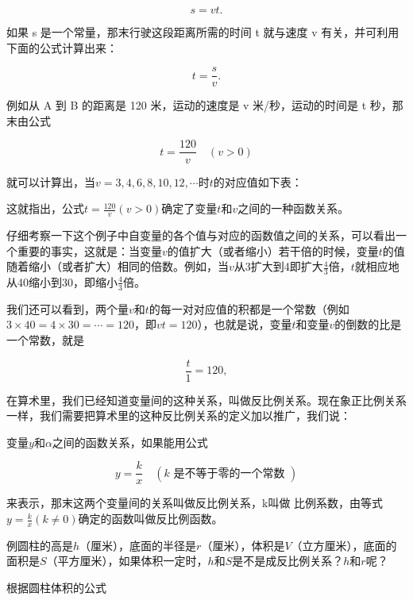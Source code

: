 \[
s = v t.
\]

如果 s 是一个常量，那末行驶这段距离所需的时间 t 就与速度 v
有关，并可利用下面的公式计算出来：

\[
t = \frac{s}{v}.
\]

例如从 A 到 B 的距离是 120 米，运动的速度是 v 米/秒，运动的时间是 t
秒，那末由公式

\[
t = \frac{120}{v} \quad (v > 0) \tag {1}
\]

就可以计算出，当\(v = 3, 4, 6, 8, 10, 12, \cdots\)时\(t\)的对应值如下表：

{\centering
\small\setlength{\tabcolsep}{3pt}%
\par
}

这就指出，公式\(t = \frac{120}{v} (v > 0)\)确定了变量\(t\)和\(v\)之间的一种函数关系。

仔细考察一下这个例子中自变量的各个值与对应的函数值之间的关系，可以看出一个重要的事实，这就是：当变量\(v\)的值扩大（或者缩小）若干倍的时候，变量\(t\)的值随着缩小（或者扩大）相同的倍数。例如，当\(v\)从3扩大到4即扩大\(\frac{4}{3}\)倍，\(t\)就相应地从40缩小到30，即缩小\(\frac{4}{3}\)倍。

我们还可以看到，两个量\(v\)和\(t\)的每一对对应值的积都是一个常数（例如\(3 \times 40 = 4 \times 30 = \cdots = 120\)，即\(vt = 120\)），也就是说，变量\(t\)和变量\(v\)的倒数的比是一个常数，就是

\[
\frac{t}{1} = 120,
\]

在算术里，我们已经知道变量间的这种关系，叫做反比例关系。现在象正比例关系一样，我们需要把算术里的这种反比例关系的定义加以推广，我们说：

变量\(y\)和\(\alpha\)之间的函数关系，如果能用公式

\[
y = \frac{k}{x} \quad (k \text{ 是不等于零的一个常数 })
\]

来表示，那末这两个变量间的关系叫做反比例关系，k叫做
比例系数，由等式\(y = \frac{k}{x} (k \neq 0)\)确定的函数叫做反比例函数。

例圆柱的高是\(h\)（厘米），底面的半径是\(r\)（厘米），体积是\(V\)（立方厘米），底面的面积是\(S\)（平方厘米），如果体积一定时，\(h\)和\(S\)是不是成反比例关系？\(h\)和\(r\)呢？

 根据圆柱体积的公式

